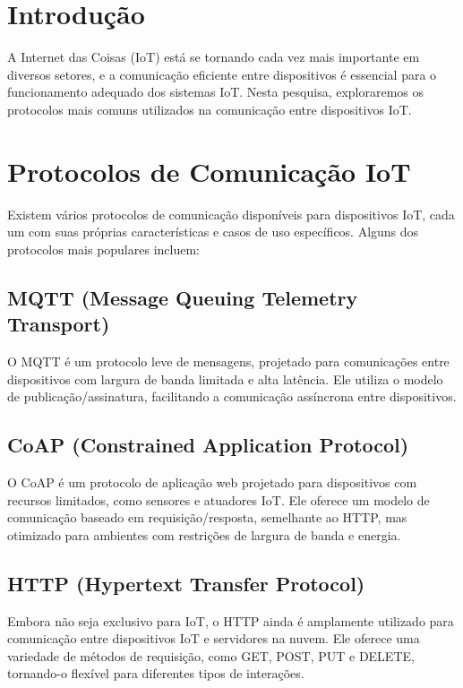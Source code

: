\documentclass{ufersa}
\begin{document}
\maketitle

\section{Introdução}
A Internet das Coisas (IoT) está se tornando cada vez mais importante em diversos setores, e a comunicação eficiente entre dispositivos é essencial para o funcionamento adequado dos sistemas IoT. Nesta pesquisa, exploraremos os protocolos mais comuns utilizados na comunicação entre dispositivos IoT.

\section{Protocolos de Comunicação IoT}
Existem vários protocolos de comunicação disponíveis para dispositivos IoT, cada um com suas próprias características e casos de uso específicos. Alguns dos protocolos mais populares incluem:

\subsection{MQTT (Message Queuing Telemetry Transport)}
O MQTT é um protocolo leve de mensagens, projetado para comunicações entre dispositivos com largura de banda limitada e alta latência. Ele utiliza o modelo de publicação/assinatura, facilitando a comunicação assíncrona entre dispositivos.

\subsection{CoAP (Constrained Application Protocol)}
O CoAP é um protocolo de aplicação web projetado para dispositivos com recursos limitados, como sensores e atuadores IoT. Ele oferece um modelo de comunicação baseado em requisição/resposta, semelhante ao HTTP, mas otimizado para ambientes com restrições de largura de banda e energia.

\subsection{HTTP (Hypertext Transfer Protocol)}
Embora não seja exclusivo para IoT, o HTTP ainda é amplamente utilizado para comunicação entre dispositivos IoT e servidores na nuvem. Ele oferece uma variedade de métodos de requisição, como GET, POST, PUT e DELETE, tornando-o flexível para diferentes tipos de interações.
\end{document}
